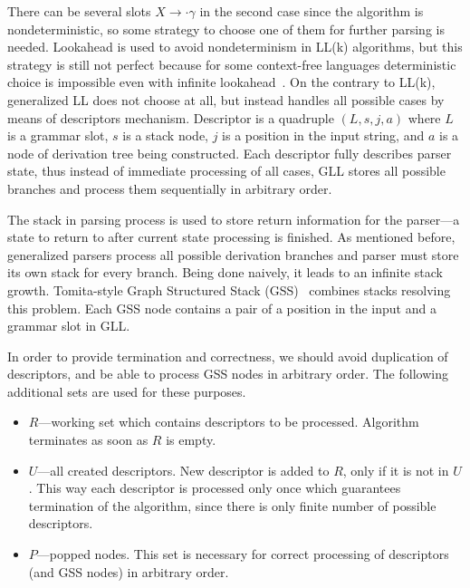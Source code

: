 There can be several slots $X \rightarrow \cdot \gamma$ in the second case since the algorithm is nondeterministic, so some strategy to choose one of them for further parsing is needed.
Lookahead is used to avoid nondeterminism in LL(k) algorithms, but this strategy is still not perfect because for some context-free languages deterministic choice is impossible even with infinite lookahead~\cite{LLnonLL}.
On the contrary to LL(k), generalized LL does not choose at all, but instead handles all possible cases by means of descriptors mechanism.
Descriptor is a quadruple $(L, s, j, a)$ where $L$ is a grammar slot, $s$ is a stack node, $j$ is a position in the input string, and $a$ is a node of derivation tree being constructed.
Each descriptor fully describes parser state, thus instead of immediate processing of all cases, GLL stores all possible branches and process them sequentially in arbitrary order.

The stack in parsing process is used to store return information for the parser---a state to return to after current state processing is finished.
As mentioned before, generalized parsers process all possible derivation branches and parser must store its own stack for every branch. 
Being done naively, it leads to an infinite stack growth.
Tomita-style Graph Structured Stack (GSS)~\cite{Tomita} combines stacks resolving this problem.
Each GSS node contains a pair of a position in the input and a grammar slot in GLL. 

In order to provide termination and correctness, we should avoid duplication of descriptors, and be able to process GSS nodes in arbitrary order. The following additional sets are used for these purposes.
\begin{itemize}
\item $R$---working set which contains descriptors to be processed. Algorithm terminates as soon as $R$ is empty.
\item $U$---all created descriptors. New descriptor is added to $R$, only if it is not in $U$.
This way each descriptor is processed only once which guarantees termination of the algorithm, since there is only finite number of possible descriptors.
\item $P$---popped nodes. This set is necessary for correct processing of descriptors (and GSS nodes) in arbitrary order.
\end{itemize}


